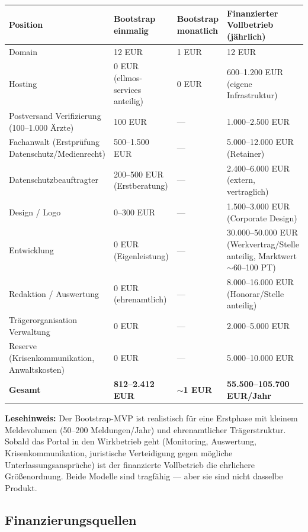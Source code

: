 \documentclass{umbruch-position}
\begin{document}
{\small
\begin{tabularx}{\textwidth}{X X X X}
\toprule
\textbf{Position} & \textbf{Bootstrap einmalig} & \textbf{Bootstrap monatlich} & \textbf{Finanzierter Vollbetrieb (jährlich)} \\
\midrule
Domain & 12 EUR & 1 EUR & 12 EUR \\
Hosting & 0 EUR (ellmos-services anteilig) & 0 EUR & 600--1.200 EUR (eigene Infrastruktur) \\
Postversand Verifizierung (100--1.000 Ärzte) & 100 EUR & — & 1.000--2.500 EUR \\
Fachanwalt (Erstprüfung Datenschutz/Medienrecht) & 500--1.500 EUR & — & 5.000--12.000 EUR (Retainer) \\
Datenschutzbeauftragter & 200--500 EUR (Erstberatung) & — & 2.400--6.000 EUR (extern, vertraglich) \\
Design / Logo & 0--300 EUR & — & 1.500--3.000 EUR (Corporate Design) \\
Entwicklung & 0 EUR (Eigenleistung) & — & 30.000--50.000 EUR (Werkvertrag/Stelle anteilig, Marktwert ${\sim}$60--100 PT) \\
Redaktion / Auswertung & 0 EUR (ehrenamtlich) & — & 8.000--16.000 EUR (Honorar/Stelle anteilig) \\
Trägerorganisation Verwaltung & 0 EUR & — & 2.000--5.000 EUR \\
Reserve (Krisenkommunikation, Anwaltskosten) & 0 EUR & — & 5.000--10.000 EUR \\
\midrule
\textbf{Gesamt} & \textbf{812--2.412 EUR} & \textbf{${\sim}$1 EUR} & \textbf{55.500--105.700 EUR/Jahr} \\
\bottomrule
\end{tabularx}
}

\textbf{Lesehinweis:} Der Bootstrap-MVP ist realistisch für eine Erstphase mit kleinem Meldevolumen (50--200 Meldungen/Jahr) und ehrenamtlicher Trägerstruktur. Sobald das Portal in den Wirkbetrieb geht (Monitoring, Auswertung, Krisenkommunikation, juristische Verteidigung gegen mögliche Unterlassungsansprüche) ist der finanzierte Vollbetrieb die ehrlichere Größenordnung. Beide Modelle sind tragfähig --- aber sie sind nicht dasselbe Produkt.


\subsection{Finanzierungsquellen}
\end{document}
